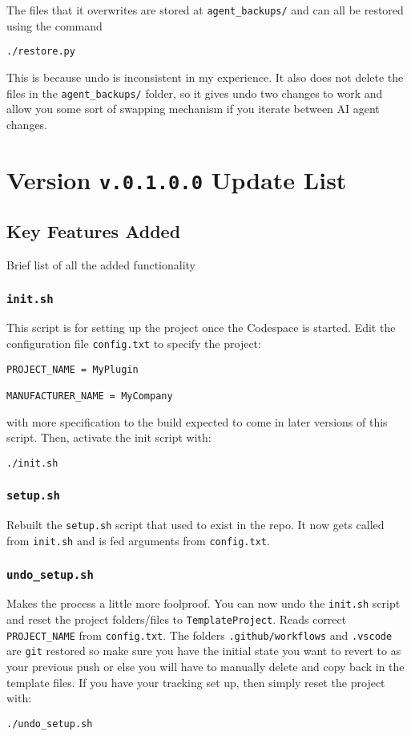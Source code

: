 \documentclass[twocolumn,natbib]{svjour3}        %
\begin{document}
The files that it overwrites are stored at \texttt{agent\_backups/} and can all be restored using the command 
\begin{lstlisting}
./restore.py
\end{lstlisting}
This is because undo is inconsistent in my experience. It also does not delete the files in the \texttt{agent\_backups/} folder, so it gives undo two changes to work and allow you some sort of swapping mechanism if you iterate between AI agent changes.

\section{Version \texttt{v.0.1.0.0} Update List}
\subsection{Key Features Added}
Brief list of all the added functionality

\subsubsection{\texttt{init.sh}}
This script is for setting up the project once the Codespace is started. Edit the configuration file \texttt{config.txt} to specify the project:
\begin{verbatim}
PROJECT_NAME = MyPlugin

MANUFACTURER_NAME = MyCompany
\end{verbatim}
with more specification to the build expected to come in later versions of this script.
Then, activate the init script with:
\begin{lstlisting}
./init.sh
\end{lstlisting}

\subsubsection{\texttt{setup.sh}} 
Rebuilt the \texttt{setup.sh} script that used to exist in the repo. It now gets called from \texttt{init.sh} and is fed arguments from \texttt{config.txt}.

\subsubsection{\protect\texttt{undo\_setup.sh}}
Makes the process a little more foolproof. You can now undo the \texttt{init.sh} script and reset the project folders/files to \texttt{TemplateProject}. Reads correct \texttt{PROJECT\_NAME} from \texttt{config.txt}. The folders \texttt{.github/workflows} and \texttt{.vscode} are \texttt{git} restored so make sure you have the initial state you want to revert to as your previous push or else you will have to manually delete and copy back in the template files. If you have your tracking set up, then simply reset the project with:
\begin{lstlisting}
./undo_setup.sh
\end{lstlisting}
\end{document}
